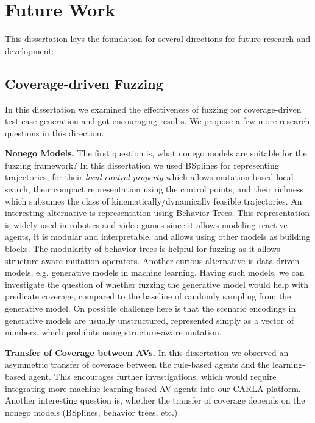 \section{Future Work}

This dissertation lays the foundation for several directions for future research and development:
\subsection{Coverage-driven Fuzzing}
In this dissertation we examined the effectiveness of fuzzing for coverage-driven test-case generation and got encouraging results.
%
We propose a few more research questions in this direction.

\textbf{Nonego Models.}
The first question is, what nonego models are suitable for the fuzzing framework?
%
In this dissertation we used BSplines for representing trajectories, for their \emph{local control property} which allows mutation-based local search, their compact representation using the control points, and their richness which subsumes the class of kinematically/dynamically feasible trajectories.
%
An interesting alternative is representation using Behavior Trees.
%
This representation is widely used in robotics and video games since it allows modeling reactive agents, it is modular and interpretable, and allows using other models as building blocks.
%
The modularity of behavior trees is helpful for fuzzing as it allows structure-aware mutation operators.
%
Another curious alternative is data-driven models, e.g. generative models in machine learning.
%
Having such models, we can investigate the question of whether fuzzing the generative model would help with predicate coverage, compared to the baseline of randomly sampling from the generative model.
%
On possible challenge here is that the scenario encodings in generative models are usually unstructured, represented simply as a vector of numbers, which prohibits using structure-aware mutation.

\textbf{Transfer of Coverage between AVs.}
In this dissertation we observed an asymmetric transfer of coverage between the rule-based agents and the learning-based agent.
%
This encourages further investigations, which would require integrating more machine-learning-based AV agents into our CARLA platform.
%
Another interesting question is, whether the transfer of coverage depends on the nonego models (BSplines, behavior trees, etc.)



